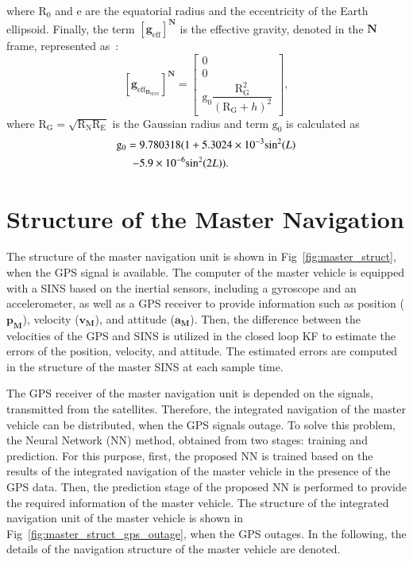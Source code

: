 \documentclass[3p]{elsarticle}
\begin{document}
where \(\mathrm{R_0}\) and \(\mathrm{e}\) are the equatorial radius and the eccentricity of the Earth ellipsoid. Finally, the term \({\left[\mathbf{g}_{\mathrm{eff}}\right]}^{\mathbf{N}}\) is the effective gravity, denoted in the \({\mathbf{N}}\) frame, represented as~\cite{groves2013principles}:
\begin{equation}
	{\left[\mathbf{g}_{\mathrm{eff}_{\mathbf{B}_{\text{SINS}}}}\right]}^{\mathbf{N}} = \begin{bmatrix}
		0 \\
		0 \\
		\mathrm{g_0}\dfrac{\mathrm{R}_{\mathrm{G}}^2}{{(\mathrm{R_G}+h)}^2}
	\end{bmatrix},
\end{equation}
where \(\mathrm{R_G} = \sqrt{\mathrm{R_N}\mathrm{R_E}} \) is the Gaussian radius and term \(\mathrm{g_0}\) is calculated as
\begin{align*}
	\mathrm{g_{\rm{0}}} =\; &9.780318(1 + 5.3024 \times {10^{ - 3}}{\sin ^2}(L)  \\
	- &5.9 \times {10^{ - 6}}{\sin ^2}(2L)).
\end{align*}




\section{Structure of the Master Navigation}\label{sec:master}
\noindent The structure of the master navigation unit is shown in Fig~\ref{fig:master_struct}, when the GPS signal is available. The computer of the master vehicle is equipped with a SINS based on the inertial sensors, including a gyroscope and an accelerometer, as well as a GPS receiver to provide information such as position (\(\mathbf{p_M}\)), velocity (\(\mathbf{v_M}\)), and attitude (\(\mathbf{a_M}\)). Then, the difference between the velocities of the GPS and SINS is utilized in the closed loop KF to estimate the errors of the position, velocity, and attitude. The estimated errors are computed in the structure of the master SINS at each sample time.





The GPS receiver of the master navigation unit is depended on the signals, transmitted from the satellites. Therefore, the integrated navigation of the master vehicle can be distributed, when the GPS signals outage. To solve this problem, the Neural Network (NN) method,
obtained from two stages:
training and prediction.
For this purpose, first, the proposed NN is trained based on the results of the integrated navigation of the master vehicle in the presence of the GPS data. Then, the prediction stage of the proposed NN is performed to provide the required information of the master vehicle. The structure of the integrated navigation unit of the master vehicle is shown in Fig~\ref{fig:master_struct_gps_outage}, when the GPS outages. In the following, the details of the navigation structure of the master vehicle are denoted.
\end{document}
